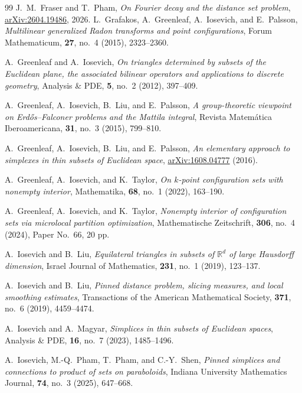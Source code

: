 \documentclass[11pt]{article}
\theoremstyle{remark}
\newcommand{\R}{\mathbb R}
\numberwithin{equation}{section}
\newcommand{\1}{\mathbf 1}
\begin{document}
\begin{thebibliography}{99}
J.~M.~Fraser and T.~Pham,
\emph{On Fourier decay and the distance set problem},
\href{https://arxiv.org/abs/2604.19486}{arXiv:2604.19486}, 2026.
L.~Grafakos, A.~Greenleaf, A.~Iosevich, and E.~Palsson,
\emph{Multilinear generalized Radon transforms and point
configurations},
Forum Mathematicum, \textbf{27}, no.~4 (2015), 2323--2360.

A.~Greenleaf and A.~Iosevich,
\emph{On triangles determined by subsets of the Euclidean plane, the
associated bilinear operators and applications to discrete geometry},
Analysis \& PDE, \textbf{5}, no.~2 (2012), 397--409.

A.~Greenleaf, A.~Iosevich, B.~Liu, and E.~Palsson,
\emph{A group-theoretic viewpoint on Erd\H{o}s--Falconer problems and
the Mattila integral},
Revista Matem\'atica Iberoamericana, \textbf{31}, no.~3 (2015),
799--810.

A.~Greenleaf, A.~Iosevich, B.~Liu, and E.~Palsson,
\emph{An elementary approach to simplexes in thin subsets of Euclidean
space},
\href{https://arxiv.org/abs/1608.04777}{arXiv:1608.04777} (2016).

A.~Greenleaf, A.~Iosevich, and K.~Taylor,
\emph{On \(k\)-point configuration sets with nonempty interior},
Mathematika, \textbf{68}, no.~1 (2022), 163--190.

A.~Greenleaf, A.~Iosevich, and K.~Taylor,
\emph{Nonempty interior of configuration sets via microlocal partition
optimization},
Mathematische Zeitschrift, \textbf{306}, no.~4 (2024),
Paper No.~66, 20 pp.

A.~Iosevich and B.~Liu,
\emph{Equilateral triangles in subsets of \(\R^d\) of large Hausdorff
dimension},
Israel Journal of Mathematics, \textbf{231}, no.~1 (2019), 123--137.

A.~Iosevich and B.~Liu,
\emph{Pinned distance problem, slicing measures, and local smoothing
estimates},
Transactions of the American Mathematical Society, \textbf{371},
no.~6 (2019), 4459--4474.

A.~Iosevich and A.~Magyar,
\emph{Simplices in thin subsets of Euclidean spaces},
Analysis \& PDE, \textbf{16}, no.~7 (2023), 1485--1496.

A.~Iosevich, M.-Q.~Pham, T.~Pham, and C.-Y.~Shen,
\emph{Pinned simplices and connections to product of sets on
paraboloids},
Indiana University Mathematics Journal, \textbf{74}, no.~3 (2025),
647--668.


\end{thebibliography}
\end{document}

